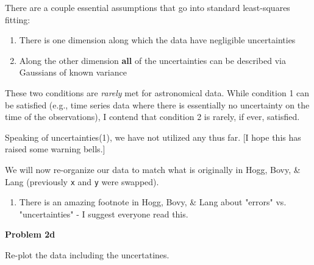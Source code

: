 \documentclass[11pt]{article}
\providecommand{\tightlist}{%
      \setlength{\itemsep}{0pt}\setlength{\parskip}{0pt}}
\begin{document}
    There are a couple essential assumptions that go into standard
least-squares fitting:

\begin{enumerate}
\def\labelenumi{\arabic{enumi}.}
\tightlist
\item
  There is one dimension along which the data have negligible
  uncertainties
\item
  Along the other dimension \textbf{all} of the uncertainties can be
  described via Gaussians of known variance
\end{enumerate}

These two conditions are \emph{rarely} met for astronomical data. While
condition 1 can be satisfied (e.g., time series data where there is
essentially no uncertainty on the time of the observations), I contend
that condition 2 is rarely, if ever, satisfied.

    Speaking of uncertainties(1), we have not utilized any thus far. {[}I
hope this has raised some warning bells.{]}

We will now re-organize our data to match what is originally in Hogg,
Bovy, \& Lang (previously \texttt{x} and \texttt{y} were swapped).

\begin{enumerate}
\def\labelenumi{(\arabic{enumi})}
\tightlist
\item
  There is an amazing footnote in Hogg, Bovy, \& Lang about "errors" vs.
  "uncertainties" - I suggest everyone read this.
\end{enumerate}

    \textbf{Problem 2d}

Re-plot the data including the uncertatines.
\end{document}
